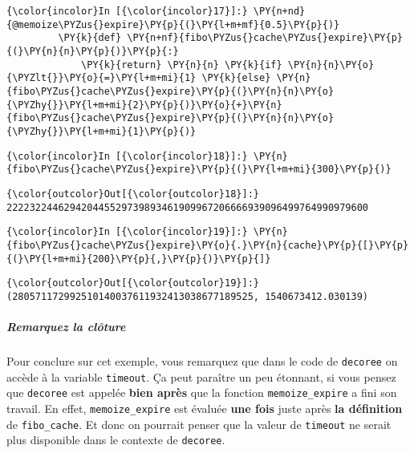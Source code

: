     \begin{Verbatim}[commandchars=\\\{\},frame=single,framerule=0.3mm,rulecolor=\color{cellframecolor}]
{\color{incolor}In [{\color{incolor}17}]:} \PY{n+nd}{@memoize\PYZus{}expire}\PY{p}{(}\PY{l+m+mf}{0.5}\PY{p}{)}
         \PY{k}{def} \PY{n+nf}{fibo\PYZus{}cache\PYZus{}expire}\PY{p}{(}\PY{n}{n}\PY{p}{)}\PY{p}{:}
             \PY{k}{return} \PY{n}{n} \PY{k}{if} \PY{n}{n}\PY{o}{\PYZlt{}}\PY{o}{=}\PY{l+m+mi}{1} \PY{k}{else} \PY{n}{fibo\PYZus{}cache\PYZus{}expire}\PY{p}{(}\PY{n}{n}\PY{o}{\PYZhy{}}\PY{l+m+mi}{2}\PY{p}{)}\PY{o}{+}\PY{n}{fibo\PYZus{}cache\PYZus{}expire}\PY{p}{(}\PY{n}{n}\PY{o}{\PYZhy{}}\PY{l+m+mi}{1}\PY{p}{)}
\end{Verbatim}


    \begin{Verbatim}[commandchars=\\\{\},frame=single,framerule=0.3mm,rulecolor=\color{cellframecolor}]
{\color{incolor}In [{\color{incolor}18}]:} \PY{n}{fibo\PYZus{}cache\PYZus{}expire}\PY{p}{(}\PY{l+m+mi}{300}\PY{p}{)}
\end{Verbatim}


\begin{Verbatim}[commandchars=\\\{\},frame=single,framerule=0.3mm,rulecolor=\color{cellframecolor}]
{\color{outcolor}Out[{\color{outcolor}18}]:} 222232244629420445529739893461909967206666939096499764990979600
\end{Verbatim}
            
    \begin{Verbatim}[commandchars=\\\{\},frame=single,framerule=0.3mm,rulecolor=\color{cellframecolor}]
{\color{incolor}In [{\color{incolor}19}]:} \PY{n}{fibo\PYZus{}cache\PYZus{}expire}\PY{o}{.}\PY{n}{cache}\PY{p}{[}\PY{p}{(}\PY{l+m+mi}{200}\PY{p}{,}\PY{p}{)}\PY{p}{]}
\end{Verbatim}


\begin{Verbatim}[commandchars=\\\{\},frame=single,framerule=0.3mm,rulecolor=\color{cellframecolor}]
{\color{outcolor}Out[{\color{outcolor}19}]:} (280571172992510140037611932413038677189525, 1540673412.030139)
\end{Verbatim}
            
    \hypertarget{remarquez-la-cluxf4ture}{%
\subparagraph{Remarquez la clôture}\label{remarquez-la-cluxf4ture}}

    Pour conclure sur cet exemple, vous remarquez que dans le code de
\texttt{decoree} on accède à la variable \texttt{timeout}. Ça peut
paraître un peu étonnant, si vous pensez que \texttt{decoree} est
appelée \textbf{bien après} que la fonction \texttt{memoize\_expire} a
fini son travail. En effet, \texttt{memoize\_expire} est évaluée
\textbf{une fois} juste après \textbf{la définition} de
\texttt{fibo\_cache}. Et donc on pourrait penser que la valeur de
\texttt{timeout} ne serait plus disponible dans le contexte de
\texttt{decoree}.

